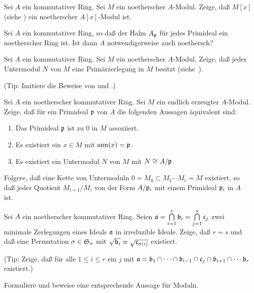 \begin{exercise}
	Sei \(A\) ein kommutativer Ring.
	Sei \(M\) ein noetherscher \(A\)-Modul. Zeige, daß \(M[x]\) (siehe
	) ein noetherscher \(A[x]\)-Modul ist.
\end{exercise}

\begin{exercise}
	Sei \(A\) ein kommutativer Ring, so daß der Halm \(A_{\mathfrak{p}}\)
	für jedes Primideal ein noetherscher Ring ist. Ist dann \(A\)
	notwendigerweise auch noethersch?
\end{exercise}

\begin{exercise}
	Sei \(A\) ein kommutativer Ring. Sei \(M\) ein noetherscher \(A\)-Modul.
	Zeige, daß jeder Untermodul \(N\) von \(M\) eine Primärzerlegung in
	\(M\) besitzt (siehe~).
	
	(Tip: Imitiere die Beweise von  und
	.)
\end{exercise}

\begin{exercise}
	\label{exer:primes_to_mod}
	Sei \(A\) ein noetherscher kommutativer Ring. Sei \(M\) ein endlich
	erzeugter \(A\)-Modul. Zeige, daß für ein Primideal \(\mathfrak{p}\) von \(A\)
	die folgenden Aussagen äquivalent sind:
	\begin{enumerate}
	\item
		Das Primideal \(\mathfrak{p}\) ist zu \(0\) in \(M\) assoziiert.
	\item
		Es existiert ein \(x \in M\) mit \(\operatorname{ann}(x) = \mathfrak{p}\).
	\item
		Es existiert ein Untermodul \(N\) von \(M\) mit \(N \cong A/\mathfrak{p}\).
	\end{enumerate}
	
	Folgere, daß eine Kette von Untermoduln \(0 = M_0 \subset M_1 \dotsb
	M_r = M\) existiert, so daß jeder Quotient \(M_{i + 1}/M_i\) von der
	Form \(A/\mathfrak{p}_i\) mit einem Primideal \(\mathfrak{p}_i\) in \(A\) ist.
\end{exercise}

\begin{exercise}
	Sei \(A\) ein noetherscher kommutativer Ring. Seien
	\(\mathfrak{a} = \bigcap\limits_{i = 1}^r \mathfrak{b}_i
	= \bigcap\limits_{j = 1}^s \mathfrak{c}_j\) zwei minimale Zerlegungen
	eines Ideals \(\mathfrak{a}\) in irreduzible Ideale. Zeige, daß
	\(r = s\) und daß eine Permutation \(\sigma \in \mathfrak S_n\) mit
	\(\sqrt{\mathfrak{b}_i} = \sqrt{\mathfrak{c}_{\sigma(i)}}\) existiert.
	
	(Tip: Zeige, daß für alle \(1 \leq i \leq r\) ein \(j\) mit
	\(\mathfrak{a} = \mathfrak{b}_1 \cap \dotsb \cap \mathfrak{b}_{i - 1} \cap
	\mathfrak{c}_j \cap \mathfrak{b}_{i + 1} \cap \dotsb \mathfrak{b}_r\) existiert.)
	
	Formuliere und beweise eine entsprechende Aussage für Moduln.
\end{exercise}


